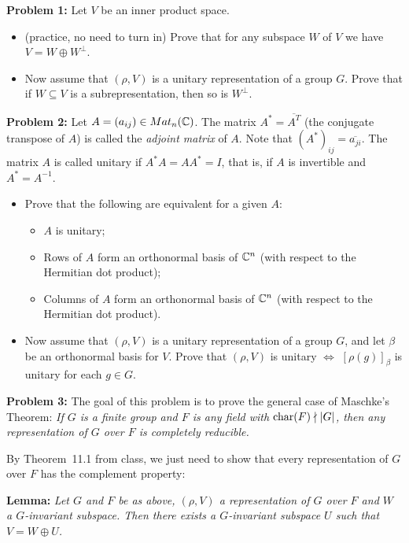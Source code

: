 \documentclass[11pt]{amsart}
\begin{document}
\skv
{\bf Problem 1:} Let $V$ be an inner product space.
\begin{itemize}
\item[(a)] (practice, no need to turn in) Prove that for any subspace $W$ of $V$ we have $V=W\oplus W^{\perp}$.
\item[(b)] Now assume that $(\rho,V)$ is a unitary representation of a group $G$. Prove that if $W\subseteq V$
is a subrepresentation, then so is $W^{\perp}$.
\end{itemize}
\skv
{\bf Problem 2:} Let $A=(a_{ij})\in Mat_n({\mathbb C})$. The matrix  $A^*=\overline{A^T}$ (the conjugate transpose of $A$) is called
the {\it adjoint matrix} of $A$. Note that $(A^*)_{ij}=\overline{a_{ji}}$. The matrix $A$ is called unitary if $A^*A=AA^*=I$, that is, if $A$ is invertible and $A^*=A^{-1}$.
\begin{itemize}
\item[(1)] Prove that the following are equivalent for a given $A$:
\begin{itemize}
\item[(a)] $A$ is unitary;
\item[(b)] Rows of $A$ form an orthonormal basis of ${\mathbb C}^n$ (with respect to the Hermitian dot product);
\item[(c)] Columns of $A$ form an orthonormal basis of ${\mathbb C}^n$ (with respect to the Hermitian dot product).
\end{itemize}
\item[(2)] Now assume that $(\rho,V)$ is a unitary representation of a group $G$, and let $\beta$ be an orthonormal basis for $V$.
Prove that $(\rho,V)$ is unitary $\iff$ $[\rho(g)]_{\beta}$ is unitary for each $g\in G$.
\end{itemize}
\skv

{\bf Problem 3:} The goal of this problem is to prove the general case of Maschke's Theorem: \it If $G$ is a finite group and $F$ is any field with
${\rm char}(F)\nmid |G|$, then any representation of $G$ over $F$ is completely reducible. \rm

\sk By Theorem~11.1 from class, we just need to show that every representation of $G$ over $F$ has the complement property:

{\bf Lemma:} \it Let $G$ and $F$ be as above, $(\rho,V)$ a representation of $G$ over $F$ and $W$ a $G$-invariant subspace. Then there exists a $G$-invariant subspace $U$ such that $V=W\oplus U$. \rm
\end{document}
